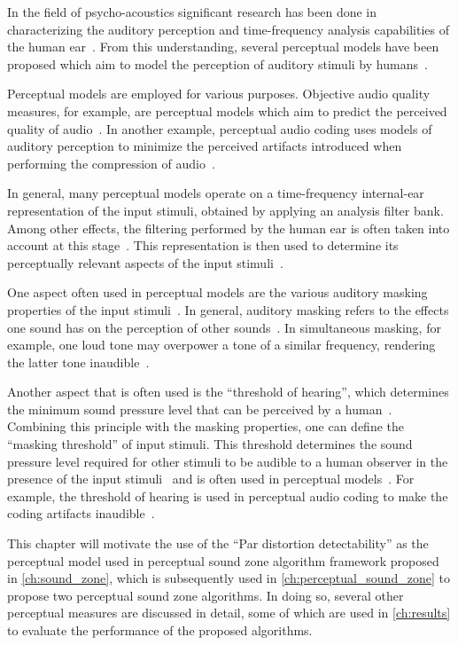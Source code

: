 In the field of psycho-acoustics significant research has been done in characterizing the auditory 
perception and time-frequency
analysis capabilities of the human ear~\cite{painter2000perceptual}.
From this understanding, several perceptual models have been proposed which aim to model the 
perception of auditory stimuli by humans~\cite{van2005perceptual}.

Perceptual models are employed for various purposes.
Objective audio quality measures, for example, are perceptual models which aim to predict the perceived quality of audio~\cite{torcoli2021objective}.
In another example, perceptual audio coding uses models of auditory perception to minimize the perceived artifacts introduced when
performing the compression of audio~\cite{herre2019psychoacoustic}.

In general, many perceptual models operate on a time-frequency internal-ear representation of the input stimuli, obtained by applying an analysis filter bank. 
Among other effects, the filtering performed by the human ear is often taken 
into account at this stage~\cite{van2005perceptual, taal2012low}.
This representation is then used to determine its perceptually relevant aspects 
of the input stimuli~\cite{herre2019psychoacoustic}.

One aspect often used in perceptual models are the various auditory masking properties of the 
input stimuli~\cite{herre2019psychoacoustic}.
In general, auditory masking refers to the effects one sound has on the perception of other sounds~\cite{painter2000perceptual}.
In simultaneous masking, for example, one loud tone may overpower a tone of a similar frequency, rendering the 
latter tone inaudible~\cite{painter2000perceptual}.

Another aspect that is often used is the ``threshold of hearing'', which determines the minimum sound pressure level that can be perceived by a human~\cite{herre2019psychoacoustic}.
Combining this principle with the masking properties, one can define the ``masking threshold'' of input stimuli.
This threshold determines the sound pressure level required for other stimuli to be audible to a human observer in the presence of the input stimuli~\cite{painter2000perceptual} and is often used in perceptual 
models~\cite{van2005perceptual, taal2012low}. 
For example, the threshold of hearing is used in perceptual audio coding to 
make the coding artifacts inaudible~\cite{herre2019psychoacoustic}.

This chapter will motivate the use of the ``Par distortion detectability'' as the perceptual model used in perceptual sound zone algorithm framework proposed in \autoref{ch:sound_zone}, which is subsequently used in \autoref{ch:perceptual_sound_zone} to propose two perceptual sound zone algorithms.
In doing so, several other perceptual measures are discussed in detail, some of which are used in \autoref{ch:results} to evaluate the performance of the proposed algorithms.

